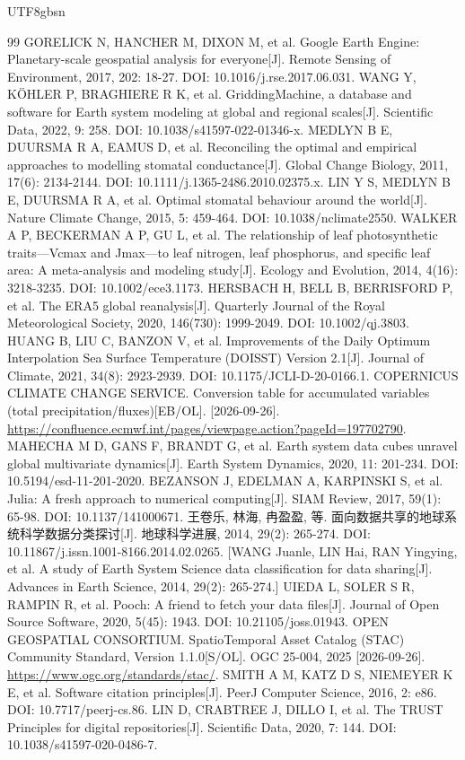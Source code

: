 \documentclass[numdoi]{chinese}
\begin{document}
\begin{CJK}{UTF8}{gbsn}
\begingroup\singlespacing\begin{thebibliography}{99}\small\setlength{\itemsep}{5pt}
GORELICK N, HANCHER M, DIXON M, et al. Google Earth Engine: Planetary-scale geospatial analysis for everyone[J]. Remote Sensing of Environment, 2017, 202: 18-27. DOI: 10.1016/j.rse.2017.06.031.
WANG Y, KÖHLER P, BRAGHIERE R K, et al. GriddingMachine, a database and software for Earth system modeling at global and regional scales[J]. Scientific Data, 2022, 9: 258. DOI: 10.1038/s41597-022-01346-x.
MEDLYN B E, DUURSMA R A, EAMUS D, et al. Reconciling the optimal and empirical approaches to modelling stomatal conductance[J]. Global Change Biology, 2011, 17(6): 2134-2144. DOI: 10.1111/j.1365-2486.2010.02375.x.
LIN Y S, MEDLYN B E, DUURSMA R A, et al. Optimal stomatal behaviour around the world[J]. Nature Climate Change, 2015, 5: 459-464. DOI: 10.1038/nclimate2550.
WALKER A P, BECKERMAN A P, GU L, et al. The relationship of leaf photosynthetic traits—Vcmax and Jmax—to leaf nitrogen, leaf phosphorus, and specific leaf area: A meta-analysis and modeling study[J]. Ecology and Evolution, 2014, 4(16): 3218-3235. DOI: 10.1002/ece3.1173.
HERSBACH H, BELL B, BERRISFORD P, et al. The ERA5 global reanalysis[J]. Quarterly Journal of the Royal Meteorological Society, 2020, 146(730): 1999-2049. DOI: 10.1002/qj.3803.
HUANG B, LIU C, BANZON V, et al. Improvements of the Daily Optimum Interpolation Sea Surface Temperature (DOISST) Version 2.1[J]. Journal of Climate, 2021, 34(8): 2923-2939. DOI: 10.1175/JCLI-D-20-0166.1.
COPERNICUS CLIMATE CHANGE SERVICE. Conversion table for accumulated variables (total precipitation/fluxes)[EB/OL]. [2026-09-26]. \url{https://confluence.ecmwf.int/pages/viewpage.action?pageId=197702790}.
MAHECHA M D, GANS F, BRANDT G, et al. Earth system data cubes unravel global multivariate dynamics[J]. Earth System Dynamics, 2020, 11: 201-234. DOI: 10.5194/esd-11-201-2020.
BEZANSON J, EDELMAN A, KARPINSKI S, et al. Julia: A fresh approach to numerical computing[J]. SIAM Review, 2017, 59(1): 65-98. DOI: 10.1137/141000671.
王卷乐, 林海, 冉盈盈, 等. 面向数据共享的地球系统科学数据分类探讨[J]. 地球科学进展, 2014, 29(2): 265-274. DOI: 10.11867/j.issn.1001-8166.2014.02.0265. [WANG Juanle, LIN Hai, RAN Yingying, et al. A study of Earth System Science data classification for data sharing[J]. Advances in Earth Science, 2014, 29(2): 265-274.]
UIEDA L, SOLER S R, RAMPIN R, et al. Pooch: A friend to fetch your data files[J]. Journal of Open Source Software, 2020, 5(45): 1943. DOI: 10.21105/joss.01943.
OPEN GEOSPATIAL CONSORTIUM. SpatioTemporal Asset Catalog (STAC) Community Standard, Version 1.1.0[S/OL]. OGC 25-004, 2025 [2026-09-26]. \url{https://www.ogc.org/standards/stac/}.
SMITH A M, KATZ D S, NIEMEYER K E, et al. Software citation principles[J]. PeerJ Computer Science, 2016, 2: e86. DOI: 10.7717/peerj-cs.86.
LIN D, CRABTREE J, DILLO I, et al. The TRUST Principles for digital repositories[J]. Scientific Data, 2020, 7: 144. DOI: 10.1038/s41597-020-0486-7.
\end{thebibliography}\endgroup
\end{CJK}
\end{document}
